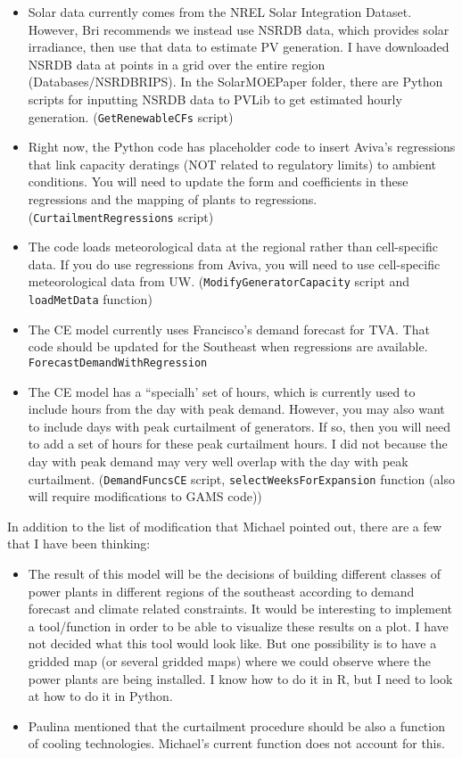 \documentclass[11pt, oneside]{article}   	%
\begin{document}
\begin{itemize}
\item Solar data currently comes from the NREL Solar Integration Dataset. However, Bri recommends we instead use NSRDB data, which provides solar irradiance, then use that data to estimate PV generation. I have downloaded NSRDB data at points in a grid over the entire region (Databases/NSRDBRIPS). In the SolarMOEPaper folder, there are Python scripts for inputting NSRDB data to PVLib to get estimated hourly generation. (\texttt{GetRenewableCFs} script)
\item Right now, the Python code has placeholder code to insert Aviva's regressions that link capacity deratings (NOT related to regulatory limits) to ambient conditions. You will need to update the form and coefficients in these regressions and the mapping of plants to regressions.  (\texttt{CurtailmentRegressions} script)
\item The code loads meteorological data at the regional rather than cell-specific data. If you do use regressions from Aviva, you will need to use cell-specific meteorological data from UW.  (\texttt{ModifyGeneratorCapacity} script and \texttt{loadMetData} function)
\item The CE model currently uses Francisco's demand forecast for TVA. That code should be updated for the Southeast when regressions are available. \\ \texttt{ForecastDemandWithRegression}
\item The CE model has a ``specialh' set of hours, which is currently used to include hours from the day with peak demand. However, you may also want to include days with peak curtailment of generators. If so, then you will need to add a set of hours for these peak curtailment hours. I did not because the day with peak demand may very well overlap with the day with peak curtailment. (\texttt{DemandFuncsCE} script, \texttt{selectWeeksForExpansion} function (also will require modifications to GAMS code))
\end{itemize}

In addition to the list of modification that Michael pointed out, there are a few that I have been thinking:
\begin{itemize}
\item The result of this model will be the decisions of building different classes of power plants in different regions of the southeast according to demand forecast and climate related constraints. It would be interesting to implement a tool/function in order to be able to visualize these results on a plot. I have not decided what this tool would look like. But one possibility is to have a gridded map (or several gridded maps) where we could observe where the power plants are being installed. I know how to do it in R, but I need to look at how to do it in Python.
\item Paulina mentioned that the curtailment procedure should be also a function of cooling technologies. Michael's current function does not account for this.
\end{itemize}
\end{document}
